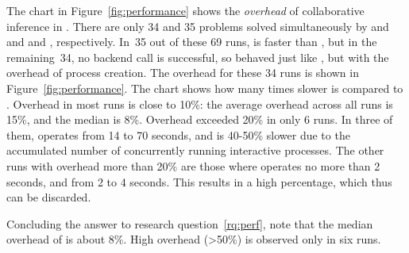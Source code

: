 The chart in Figure~\ref{fig:performance} shows the \textit{overhead} of collaborative inference in \theringenCICI{}. There are only 34 and 35 problems solved simultaneously by \racer{} and \ringenCICI{\cvc{}} and \racer{} and \ringenCICI{\vampire{}}, respectively. In~35 out of these 69 runs, \theringenCICI{} is faster than \racer{}, but in the remaining~34, no backend call is successful, so \theringenCICI{} behaved just like \racer{}, but with the overhead of process creation. The overhead for these 34 runs is shown in Figure~\ref{fig:performance}. The chart shows how many times slower is \theringenCICI{} compared to \racer{}. Overhead in most runs is close to 10\%: the average overhead across all runs is 15\%, and the median is 8\%.
Overhead exceeded 20\% in only 6 runs. In three of them, \racer{} operates from 14 to 70 seconds, and \theringenCICI{} is 40-50\% slower due to the accumulated number of concurrently running interactive processes. The other runs with overhead more than 20\% are those where \racer{} operates no more than 2 seconds, and \theringenCICI{} from 2 to 4 seconds. This results in a high percentage, which thus can be discarded.

Concluding the answer to research question~\ref{rq:perf}, note that the median overhead of \theringenCICI{} is about 8\%. High overhead (>50\%) is observed only in six runs.

